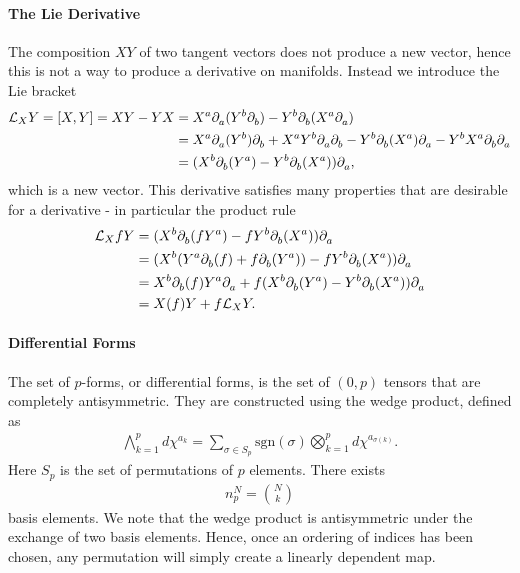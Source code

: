 \paragraph{The Lie Derivative}
The composition $XY$ of two tangent vectors does not produce a new vector, hence this is not a way to produce a derivative on manifolds. Instead we introduce the Lie bracket
\begin{align*}
	\lied{X}{Y} =\comm{X}{Y} = XY - YX &= X^{a}\del{a}{(Y^{b}\del{b}{})} - Y^{b}\del{b}{(X^{a}\del{a}{})} \\
	                                   &= X^{a}\del{a}{(Y^{b})}\del{b}{} + X^{a}Y^{b}\del{a}{\del{b}{}} - Y^{b}\del{b}{(X^{a})}\del{a}{} - Y^{b}X^{a}\del{b}{\del{a}{}} \\
	                                   &= (X^{b}\del{b}{(Y^{a})} - Y^{b}\del{b}{(X^{a})})\del{a}{},
\end{align*}
which is a new vector. This derivative satisfies many properties that are desirable for a derivative - in particular the product rule
\begin{align*}
	\mathcal{L}_{X}fY &= (X^{b}\partial^{}_{b}(fY^{a}) - fY^{b}\partial^{}_{b}(X^{a}))\partial^{}_{a} \\
	             &= (X^{b}(Y^{a}\partial^{}_{b}(f) + f\partial^{}_{b}(Y^{a})) - fY^{b}\partial^{}_{b}(X^{a}))\partial^{}_{a} \\
	             &= X^{b}\partial^{}_{b}(f)Y^{a}\partial^{}_{a} + f(X^{b}\partial^{}_{b}(Y^{a}) - Y^{b}\partial^{}_{b}(X^{a}))\partial^{}_{a} \\
	             &= X(f)Y + f\mathcal{L}_{X}Y.
\end{align*}

\paragraph{Differential Forms}
The set of $p$-forms, or differential forms, is the set of $(0, p)$ tensors that are completely antisymmetric. They are constructed using the wedge product, defined as
\begin{align*}
	\bigwedge\limits_{k = 1}^{p}d\chi^{a_{k}} = \sum\limits_{\sigma\in S_{p}}\text{sgn}(\sigma)\bigotimes_{k = 1}^{p}d\chi^{a_{\sigma(k)}}.
\end{align*}
Here $S_{p}$ is the set of permutations of $p$ elements. There exists
\begin{align*}
	n_{p}^{N} = {N\choose k}
\end{align*}
basis elements. We note that the wedge product is antisymmetric under the exchange of two basis elements. Hence, once an ordering of indices has been chosen, any permutation will simply create a linearly dependent map.

